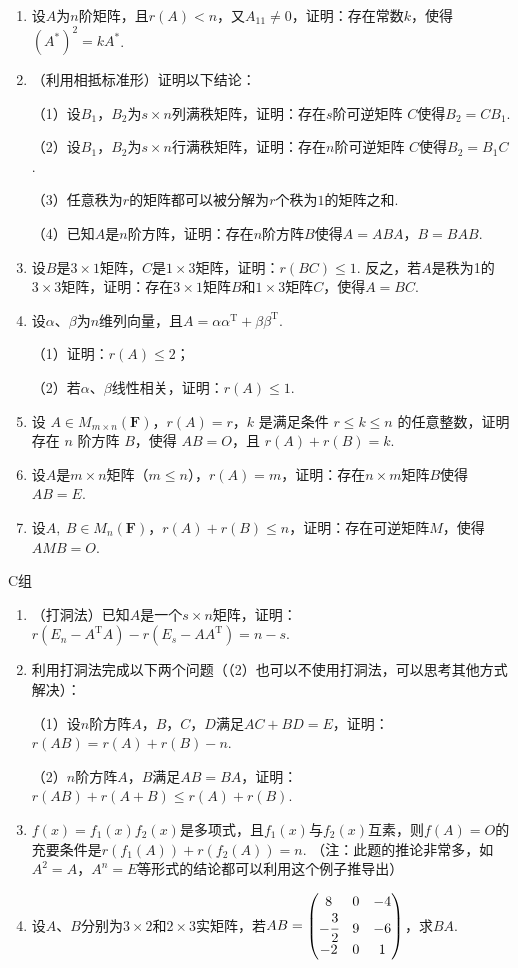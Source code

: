 \begin{enumerate}
	\item 设$A$为$n$阶矩阵，且$r(A) < n$，又$A_{11} \neq 0$，证明：存在常数$k$，使得
	$(A^*)^2=kA^*$.
	\item （利用相抵标准形）证明以下结论：
	
	（1）设$B_1$，$B_2$为$s \times n$列满秩矩阵，证明：存在$s$阶可逆矩阵
	$C$使得$B_2=CB_1$.

	（2）设$B_1$，$B_2$为$s \times n$行满秩矩阵，证明：存在$n$阶可逆矩阵
	$C$使得$B_2=B_1C$.
	
	（3）任意秩为$r$的矩阵都可以被分解为$r$个秩为$1$的矩阵之和.

	（4）已知$A$是$n$阶方阵，证明：存在$n$阶方阵$B$使得$A=ABA$，$B=BAB$.
	\item 设$B$是$3 \times 1$矩阵，$C$是$1 \times 3$矩阵，证明：$r(BC) \le 1$.
	反之，若$A$是秩为1的$3 \times 3$矩阵，证明：存在$3 \times 1$矩阵$B$和$1 \times 3$矩阵$C$，使得$A = BC$.
	\item 设$\alpha$、$\beta$为$n$维列向量，且$A=\alpha\alpha^\mathrm{T}+\beta\beta^\mathrm{T}$.
	
	（1）证明：$r(A) \le 2$；

	（2）若$\alpha$、$\beta$线性相关，证明：$r(A) \le 1$.
	\item 设 $A \in M_{m \times n}(\mathbf{F})$，$r(A)=r$，$k$ 是满足条件 $r \leq k \leq n$ 的任意整数，证明存在 $n$ 阶方阵 $B$，使得 $AB=O$，且 $r(A)+r(B)=k$.
	\item 设$A$是$m \times n$矩阵（$m \le n$），$r(A)=m$，证明：存在$n \times m$矩阵$B$使得$AB=E$.
	\item 设$A,\ B \in M_n(\mathbf{F})$，$r(A)+r(B) \le n$，证明：存在可逆矩阵$M$，使得$AMB=O$.
\end{enumerate}

\centerline{\heiti C组}
\begin{enumerate}
	\item （打洞法）已知$A$是一个$s \times n$矩阵，证明：$r(E_n-A^\mathrm{T}A)-r(E_s-AA^\mathrm{T})=n-s$.
	\item 利用打洞法完成以下两个问题（（2）也可以不使用打洞法，可以思考其他方式解决）：
	
	（1）设$n$阶方阵$A$，$B$，$C$，$D$满足$AC+BD=E$，证明：$r(AB) = r(A)+r(B)-n$.
	
	（2）$n$阶方阵$A$，$B$满足$AB=BA$，证明：$r(AB)+r(A+B)\le r(A)+r(B)$.
	\item $f(x)=f_1(x)f_2(x)$是多项式，且$f_1(x)$与$f_2(x)$互素，则$f(A)=O$的充要条件是$r(f_1(A))+r(f_2(A))=n$.
	（注：此题的推论非常多，如$A^2=A$，$A^n=E$等形式的结论都可以利用这个例子推导出）
	\item 设$A$、$B$分别为$3 \times 2$和$2 \times 3$实矩阵，若$AB=\begin{pmatrix}
		8 & 0 & -4 \\ -\cfrac{3}{2} & 9 & -6 \\ -2 & 0 & 1
	\end{pmatrix}$，求$BA$.
\end{enumerate}
